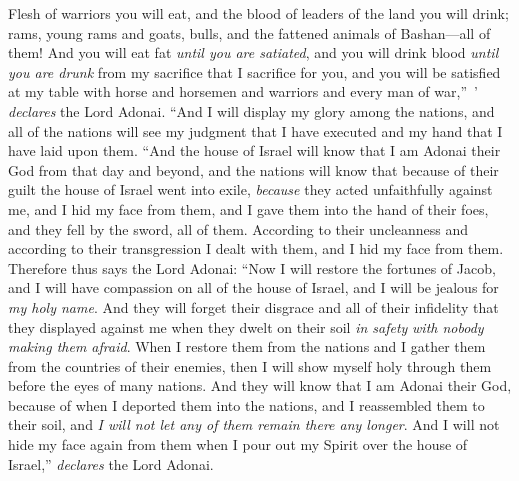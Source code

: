 \begin{biblechapter}
\verse Flesh of warriors you will eat, and the blood of leaders of the land you will drink; rams, young rams and goats, bulls, and the fattened animals of Bashan—all of them!
\verse And you will eat fat \textit{until you are satiated}, and you will drink blood \textit{until you are drunk} from my sacrifice that I sacrifice for you,
\verse and you will be satisfied at my table with horse and horsemen and warriors and every man of war,” ’ \textit{declares} the Lord Adonai.
\verse “And I will display my glory among the nations, and all of the nations will see my judgment that I have executed and my hand that I have laid upon them.
\verse “And the house of Israel will know that I am Adonai their God from that day and beyond,
\verse and the nations will know that because of their guilt the house of Israel went into exile, \textit{because} they acted unfaithfully against me, and I hid my face from them, and I gave them into the hand of their foes, and they fell by the sword, all of them.
\verse According to their uncleanness and according to their transgression I dealt with them, and I hid my face from them.
\verse Therefore thus says the Lord Adonai: “Now I will restore the fortunes of Jacob, and I will have compassion on all of the house of Israel, and I will be jealous for \textit{my holy name}.
\verse And they will forget their disgrace and all of their infidelity that they displayed against me when they dwelt on their soil \textit{in safety} \textit{with nobody making them afraid}.
\verse When I restore them from the nations and I gather them from the countries of their enemies, then I will show myself holy through them before the eyes of many nations.
\verse And they will know that I am Adonai their God, because of when I deported them into the nations, and I reassembled them to their soil, and \textit{I will not let any of them remain there any longer}.
\verse And I will not hide my face again from them when I pour out my Spirit over the house of Israel,” \textit{declares} the Lord Adonai.
\end{biblechapter}

